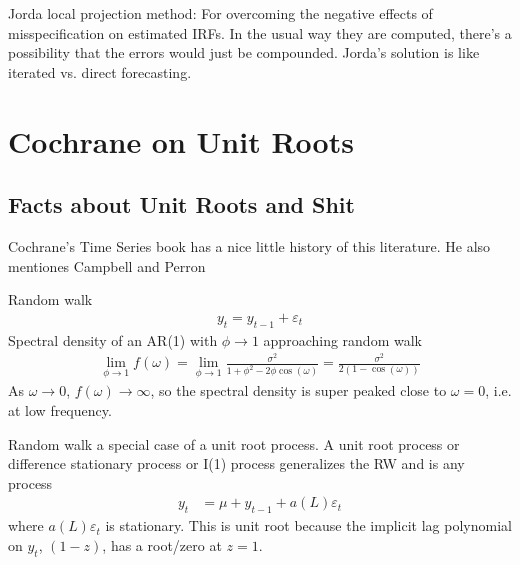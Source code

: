 \documentclass[12pt]{article}
\theoremstyle{plain}
\theoremstyle{definition}
\theoremstyle{remark}
\newcommand{\ra}{\rightarrow}
\begin{document}
Jorda local projection method: For overcoming the negative effects of
misspecification on estimated IRFs. In the usual way they are computed,
there's a possibility that the errors would just be compounded.
Jorda's solution is like iterated vs. direct forecasting.



\clearpage
\section{Cochrane on Unit Roots}

\subsection{Facts about Unit Roots and Shit}

Cochrane's Time Series book has a nice little history of this
literature. He also mentiones Campbell and Perron

Random walk
\begin{align}
  y_t = y_{t-1} + \varepsilon_t
  \label{rw}
\end{align}
Spectral density of an AR(1) with $\phi\ra 1$ approaching random walk
\begin{align*}
  \lim_{\phi\ra 1}f(\omega)
  =
  \lim_{\phi\ra 1}
  \frac{\sigma^2}{1+\phi^2-2\phi \cos(\omega)}
  =
  \frac{\sigma^2}{2(1-\cos(\omega))}
\end{align*}
As $\omega\ra 0$, $f(\omega)\ra \infty$, so the spectral density is
super peaked close to $\omega=0$, i.e. at low frequency.

Random walk a special case of a unit root process. A unit root process
or difference stationary process or I(1) process generalizes the RW and
is any process
\begin{align}
  y_t &= \mu + y_{t-1} + a(L)\varepsilon_t
  \label{I1}
\end{align}
where $a(L)\varepsilon_t$ is stationary.
This is unit root because the implicit lag polynomial on $y_t$,
$(1-z)$, has a root/zero at $z=1$.
\end{document}
